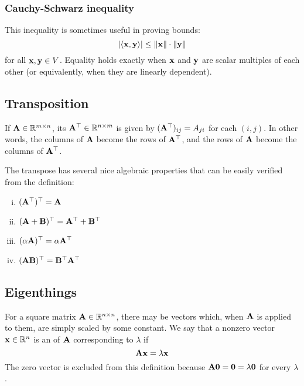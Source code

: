 \subsubsection{Cauchy-Schwarz inequality}
This inequality is sometimes useful in proving bounds:
\[|\langle \mathbf{x}, \mathbf{y} \rangle| \leq \|\mathbf{x}\| \cdot \|\mathbf{y}\|\]
for all $\mathbf{x}, \mathbf{y} \in V$. Equality holds exactly when $\mathbf{x}$ and $\mathbf{y}$ are scalar multiples of each other (or equivalently, when they are linearly dependent).

\subsection{Transposition}
If $\mathbf{A} \in \mathbb{R}^{m \times n}$, its  $\mathbf{A}^\top \in \mathbb{R}^{n \times m}$ is given by $(\mathbf{A}^\top)_{ij} = A_{ji}$ for each $(i, j)$.
In other words, the columns of $\mathbf{A}$ become the rows of $\mathbf{A}^\top$, and the rows of $\mathbf{A}$ become the columns of $\mathbf{A}^\top$.

The transpose has several nice algebraic properties that can be easily verified from the definition:
\begin{enumerate}[(i)]
\item $(\mathbf{A}^\top)^\top = \mathbf{A}$
\item $(\mathbf{A}+\mathbf{B})^\top = \mathbf{A}^\top + \mathbf{B}^\top$
\item $(\alpha \mathbf{A})^\top = \alpha \mathbf{A}^\top$
\item $(\mathbf{A}\mathbf{B})^\top = \mathbf{B}^\top \mathbf{A}^\top$
\end{enumerate}

\subsection{Eigenthings}
For a square matrix $\mathbf{A} \in \mathbb{R}^{n \times n}$, there may be vectors which, when $\mathbf{A}$ is applied to them, are simply scaled by some constant.
We say that a nonzero vector $\mathbf{x} \in \mathbb{R}^n$ is an  of $\mathbf{A}$ corresponding to  $\lambda$ if
\[\mathbf{A}\mathbf{x} = \lambda\mathbf{x}\]
The zero vector is excluded from this definition because $\mathbf{A}\mathbf{0} = \mathbf{0} = \lambda\mathbf{0}$ for every $\lambda$.

